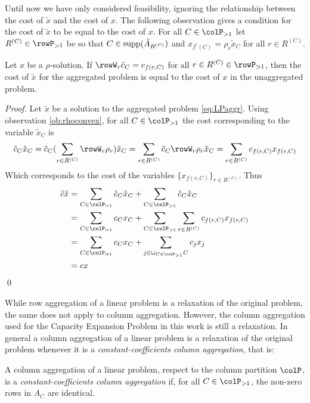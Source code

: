 Until now we have only considered feasibility, ignoring the relationship between the cost of \(\tilde{x}\) and the cost of \(x\). The following observation gives a condition for the cost of \(\tilde{x}\) to be equal to the cost of \(x\).
For all \(C \in \colP_{>1}\) let  \(R^{(C)} \in \rowP_{>1}\) be so that \(C \in \operatorname{supp}(\tilde{A}_{R^{(C)}})\) and \(x_{f^r(C)} = \rho_r \tilde{x}_C\) for all \(r \in R^{(C)}\).
\begin{observation}
  \label{ob:costpreserving}
  Let \(x\) be a \(\rho\)-solution. If  \(\rowW_r\tilde{c}_C = c_{f(r,C)}\) for all \(r \in R^{(C)} \in \rowP_{>1}\), then the cost of \(\tilde{x}\) for the aggregated problem 
  is equal to the cost of \(x\) in the unaggregated problem. 
\end{observation}
\begin{proof}
  Let \(\tilde{x}\) be a solution to the aggregated problem \eqref{eq:LPaggr}. Using observation \ref{ob:rhoconvex}, for all \(C \in \colP_{>1}\) the cost corresponding to the variable \(\tilde{x}_C\) is 
  \[
  \tilde{c}_C\tilde{x}_C = \tilde{c}_C(\sum_{r \in R^{(C)}}\rowW_r\rho_r)\tilde{x}_C = \sum_{r \in R^{(C)}}\tilde{c}_C\rowW_r\rho_r\tilde{x}_C  = \sum_{r \in R^{(C)}}c_{f(r,C)}x_{f(r,C)}
  \]
  Which corresponds to the cost of the variables \(\{x_{f(r,C)}\}_{r \in R^{(C)}}\). Thus
  \begin{align*}
  \tilde{c}\tilde{x} &= \sum_{C \in \colP_{=1}}\tilde{c}_C\tilde{x}_C + \sum_{C \in \colP_{>1}}\tilde{c}_C\tilde{x}_C \\
                    &= \sum_{C \in \colP_{=1}}c_Cx_C + \sum_{C \in \colP_{>1}}\sum_{r \in R^{(C)}}c_{f(r,C)}x_{f(r,C)} \\
                    &= \sum_{C \in \colP_{=1}}c_Cx_C + \sum_{j \in \cup_{C \in \colP_{>1}}C}c_{j}x_{j} \\
                    &= cx
  \end{align*}
\qed
\end{proof}


While row aggregation of a linear problem is a relaxation of the original problem, the same does not apply to column aggregation. However, the column aggregation used for the  Capacity Expansion Problem in this work is still a relaxation. In general a column aggregation of a linear problem is a relaxation of the original problem whenever it is a \emph{constant-coefficients column aggregation}, that is:
\begin{definition}
  A column aggregation of a linear problem, respect to the column partition \(\colP\), is a \emph{constant-coefficients column aggregation} if, for all \(C \in \colP_{>1}\), the non-zero rows in \(A_C\) are identical.
\end{definition}

